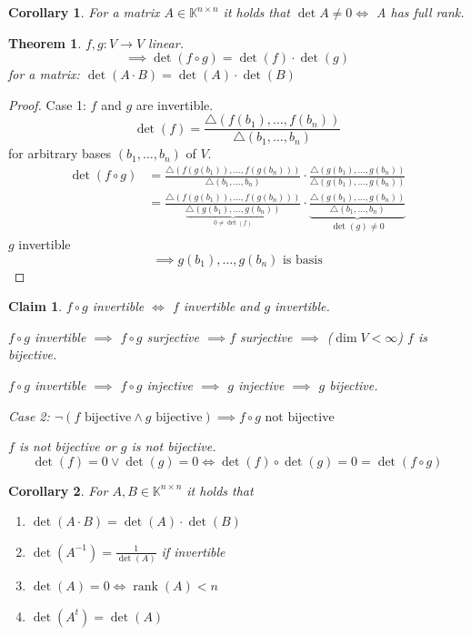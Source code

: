 \documentclass{article}
\newtheorem{theorem}{Theorem}  \numberwithin{theorem}{section}
\newtheorem*{claim}{Claim}%
\newtheorem*{corollary}{Corollary}%
\DeclareMathOperator{\rank}{rank}
\begin{document}
\begin{corollary}
  For a matrix $A \in \mathbb K^{n\times n}$ it holds that $\det{A} \neq 0 \iff$ A has full rank.
\end{corollary}

\begin{theorem} %
  $f, g: V \to V$ linear.
  \[ \implies \det(f \circ g) = \det(f) \cdot \det(g) \]
  for a matrix: $\det(A \cdot B) = \det(A) \cdot \det(B)$
\end{theorem}

\begin{proof}
  Case 1: $f$ and $g$ are invertible.
  \[ \det(f) = \frac{\triangle (f(b_1), \dots, f(b_n))}{\triangle(b_1, \dots, b_n)} \]
  for arbitrary bases $(b_1, \dots, b_n)$ of $V$.
  \begin{align*}
    \det(f \circ g) &= \frac{\triangle(f(g(b_1)), \dots, f(g(b_n)))}{\triangle(b_1, \dots, b_n)} \cdot \frac{\triangle(g(b_1), \dots, g(b_n))}{\triangle(g(b_1), \dots, g(b_n))} \\
      &= \frac{\triangle(f(g(b_1)), \dots, f(g(b_n)))}{\underbrace{\triangle(g(b_1), \dots, g(b_n))}_{0 \neq \det(f)}} \cdot \underbrace{\frac{\triangle(g(b_1), \dots, g(b_n))}{\triangle(b_1, \dots, b_n)}}_{\det(g) \neq 0}
  \end{align*}
  $g$ invertible
  \[ \implies g(b_1), \dots, g(b_n) \text{ is basis} \]
\end{proof}

\begin{claim}
  $f \circ g$ invertible $\iff$ $f$ invertible and $g$ invertible.

  $f \circ g$ invertible $\implies$ $f \circ g$ surjective $\implies f$ surjective $\implies$ ($\dim{V} < \infty$) $f$ is bijective.

  $f \circ g$ invertible $\implies$ $f \circ g$ injective $\implies$ $g$ injective $\implies$ $g$ bijective.

  Case 2: $\neg(f \text{ bijective} \land g \text{ bijective}) \implies f \circ g \text{ not bijective}$

  $f$ is not bijective or $g$ is not bijective.
  \[ \det(f) = 0 \lor \det(g) = 0 \iff \det(f) \circ \det(g) = 0 = \det(f \circ g) \]
\end{claim}

\begin{corollary} %
  \label{cor730}
  For $A, B \in \mathbb K^{n\times n}$ it holds that
  \begin{enumerate}
    \item $\det(A \cdot B) = \det(A) \cdot \det(B)$
    \item $\det(A^{-1}) = \frac{1}{\det(A)}$ if invertible
    \item $\det(A) = 0 \iff \rank(A) < n$
    \item $\det(A^t) = \det(A)$
  \end{enumerate}
\end{corollary}
\end{document}
